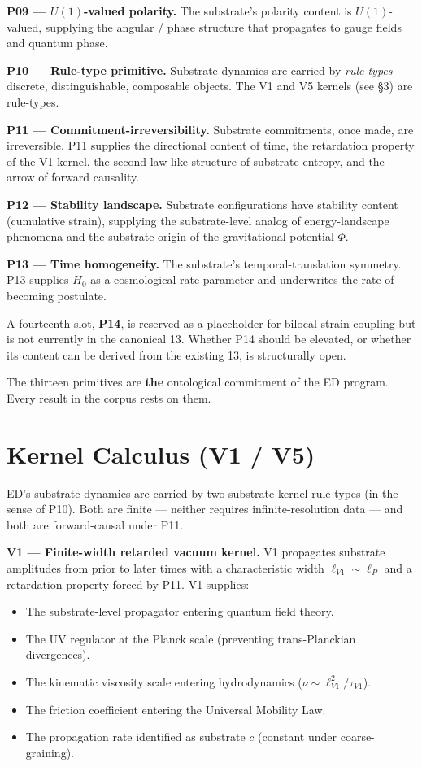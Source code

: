 \documentclass[11pt,a4paper]{article}
\begin{document}
\textbf{P09 --- $U(1)$-valued polarity.} The substrate's polarity content is $U(1)$-valued, supplying the angular / phase structure that propagates to gauge fields and quantum phase.

\textbf{P10 --- Rule-type primitive.} Substrate dynamics are carried by \emph{rule-types} --- discrete, distinguishable, composable objects. The V1 and V5 kernels (see \S3) are rule-types.

\textbf{P11 --- Commitment-irreversibility.} Substrate commitments, once made, are irreversible. P11 supplies the directional content of time, the retardation property of the V1 kernel, the second-law-like structure of substrate entropy, and the arrow of forward causality.

\textbf{P12 --- Stability landscape.} Substrate configurations have stability content (cumulative strain), supplying the substrate-level analog of energy-landscape phenomena and the substrate origin of the gravitational potential $\Phi$.

\textbf{P13 --- Time homogeneity.} The substrate's temporal-translation symmetry. P13 supplies $H_0$ as a cosmological-rate parameter and underwrites the rate-of-becoming postulate.

A fourteenth slot, \textbf{P14}, is reserved as a placeholder for bilocal strain coupling but is not currently in the canonical 13. Whether P14 should be elevated, or whether its content can be derived from the existing 13, is structurally open.

The thirteen primitives are \textbf{the} ontological commitment of the ED program. Every result in the corpus rests on them.

\section{Kernel Calculus (V1 / V5)}

ED's substrate dynamics are carried by two substrate kernel rule-types (in the sense of P10). Both are finite --- neither requires infinite-resolution data --- and both are forward-causal under P11.

\textbf{V1 --- Finite-width retarded vacuum kernel.} V1 propagates substrate amplitudes from prior to later times with a characteristic width $\ell_{V1} \sim \ell_P$ and a retardation property forced by P11. V1 supplies:

\begin{itemize}[noitemsep]
\item The substrate-level propagator entering quantum field theory.
\item The UV regulator at the Planck scale (preventing trans-Planckian divergences).
\item The kinematic viscosity scale entering hydrodynamics ($\nu \sim \ell_{V1}^2 / \tau_{V1}$).
\item The friction coefficient entering the Universal Mobility Law.
\item The propagation rate identified as substrate $c$ (constant under coarse-graining).
\end{itemize}
\end{document}
